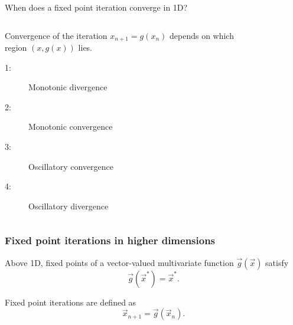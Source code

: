 \documentclass{beamer}
\begin{document}
\begin{frame}{When does a fixed point iteration converge in 1D?}
\begin{columns}
\begin{column}{0.5\textwidth}
Convergence of the iteration $x_{n+1} = g(x_n)$ depends on which region $(x,g(x))$ lies.

\begin{description}
    \item[1:] Monotonic divergence
    \item[2:] Monotonic convergence
    \item[3:] Oscillatory convergence
    \item[4:] Oscillatory divergence
\end{description}
\end{column}
\begin{column}{0.5\textwidth}
    \begin{figure}
        \centering
        \label{fig:FP}
    \end{figure}
\end{column}
\end{columns}
\end{frame}

\begin{frame}
\frametitle{Fixed point iterations in higher dimensions}

Above 1D, fixed points of a vector-valued multivariate function $\vec{g}(\vec{x})$ satisfy
\begin{equation*}
	\vec{g}(\vec{x}^*) = \vec{x}^*.
\end{equation*}

Fixed point iterations are defined as
\begin{equation*}
	\vec{x}_{n+1} = \vec{g} ( \vec{x}_n).
\end{equation*}

\end{frame}
\end{document}
